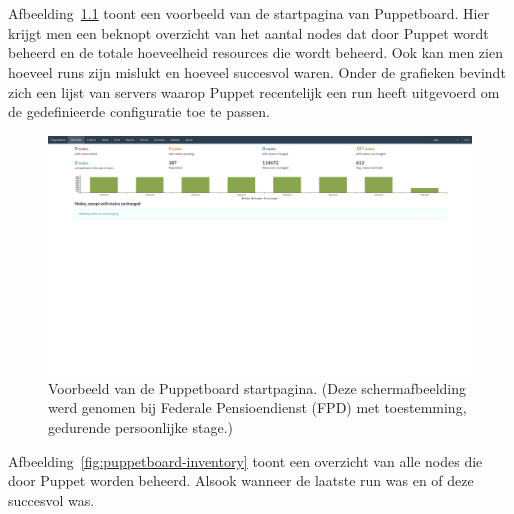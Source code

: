 
\chapter{}%
\label{ch:bijlage_puppetboard}

Afbeelding~\ref{fig:puppetboard-home} toont een voorbeeld van de startpagina van Puppetboard.
Hier krijgt men een beknopt overzicht van het aantal nodes dat door Puppet wordt beheerd en de totale hoeveelheid resources die wordt beheerd.
Ook kan men zien hoeveel runs zijn mislukt en hoeveel succesvol waren.
Onder de grafieken bevindt zich een lijst van servers waarop Puppet recentelijk een run heeft uitgevoerd om de gedefinieerde configuratie toe te passen.

\begin{figure}[h!]
    \includegraphics[width=\textwidth]
    {./graphics/state-of-the-art/puppetboard/puppetboard-home.png}
    \caption[Puppetboard startpagina.]{\label{fig:puppetboard-home}Voorbeeld van de Puppetboard startpagina. (Deze schermafbeelding werd genomen bij Federale Pensioendienst (FPD) met toestemming, gedurende persoonlijke stage.)}
\end{figure}

Afbeelding~\ref{fig:puppetboard-inventory} toont een overzicht van alle nodes die door Puppet worden beheerd.
Alsook wanneer de laatste run was en of deze succesvol was.

